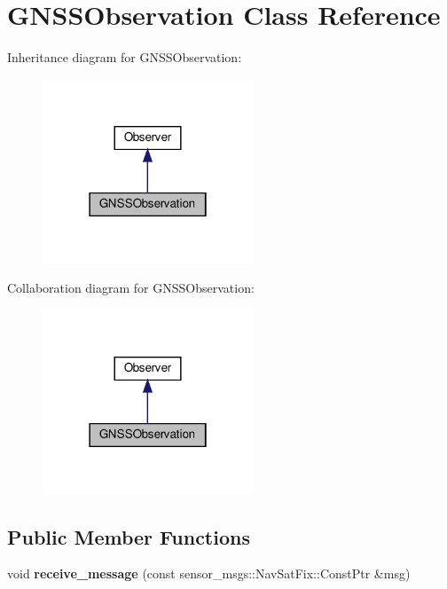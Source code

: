 \hypertarget{classGNSSObservation}{}\section{G\+N\+S\+S\+Observation Class Reference}
\label{classGNSSObservation}


Inheritance diagram for G\+N\+S\+S\+Observation\+:
\nopagebreak
\begin{figure}[H]
\begin{center}
\leavevmode
\includegraphics[width=178pt]{classGNSSObservation__inherit__graph}
\end{center}
\end{figure}


Collaboration diagram for G\+N\+S\+S\+Observation\+:
\nopagebreak
\begin{figure}[H]
\begin{center}
\leavevmode
\includegraphics[width=178pt]{classGNSSObservation__coll__graph}
\end{center}
\end{figure}
\subsection*{Public Member Functions}
\begin{DoxyCompactItemize}
\item 
\mbox{\label{classGNSSObservation_afd04d0b5d0a942a4402e00bb1748e1df}} 
void {\bfseries receive\+\_\+message} (const sensor\+\_\+msgs\+::\+Nav\+Sat\+Fix\+::\+Const\+Ptr \&msg)
\end{DoxyCompactItemize}

